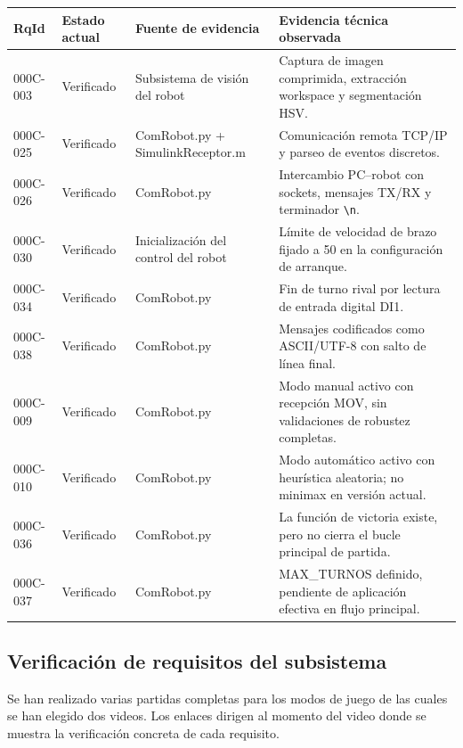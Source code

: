 \documentclass[12pt,a4paper]{article}
\begin{document}
{\footnotesize
\begin{longtable}{@{}>{\raggedright\arraybackslash}p{} >{\raggedright\arraybackslash}p{} >{\raggedright\arraybackslash}p{} >{\raggedright\arraybackslash}p{}@{}}
\toprule
\textbf{RqId} & \textbf{Estado actual} & \textbf{Fuente de evidencia} & \textbf{Evidencia t\'ecnica observada} \\
\midrule
\endhead
000C-003 & Verificado & Subsistema de visi\'on del robot & Captura de imagen comprimida, extracci\'on workspace y segmentaci\'on HSV. \\
000C-025 & Verificado & ComRobot.py + SimulinkReceptor.m & Comunicaci\'on remota TCP/IP y parseo de eventos discretos. \\
000C-026 & Verificado & ComRobot.py & Intercambio PC--robot con sockets, mensajes TX/RX y terminador \texttt{\textbackslash n}. \\
000C-030 & Verificado & Inicializaci\'on del control del robot & L\'imite de velocidad de brazo fijado a 50 en la configuraci\'on de arranque. \\
000C-034 & Verificado & ComRobot.py & Fin de turno rival por lectura de entrada digital DI1. \\
000C-038 & Verificado & ComRobot.py & Mensajes codificados como ASCII/UTF-8 con salto de l\'inea final. \\
000C-009 & Verificado & ComRobot.py & Modo manual activo con recepci\'on MOV, sin validaciones de robustez completas. \\
000C-010 & Verificado & ComRobot.py & Modo autom\'atico activo con heur\'istica aleatoria; no minimax en versi\'on actual. \\
000C-036 & Verificado & ComRobot.py & La funci\'on de victoria existe, pero no cierra el bucle principal de partida. \\
000C-037 & Verificado & ComRobot.py & MAX\_TURNOS definido, pendiente de aplicaci\'on efectiva en flujo principal. \\
\bottomrule
\end{longtable}     
}

\subsection{Verificación de requisitos del subsistema}

Se han realizado varias partidas completas para los modos de juego de las cuales se han elegido dos videos. Los enlaces dirigen al momento del video donde se muestra la verificación concreta de cada requisito.
\end{document}
